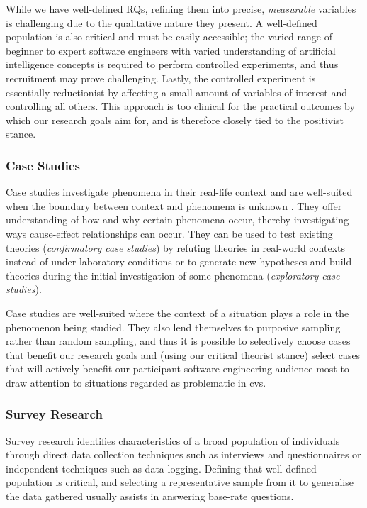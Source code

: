 While we have well-defined RQs, refining them into precise, \textit{measurable} variables is challenging due to the qualitative nature they present. A well-defined population is also critical and must be easily accessible; the varied range of beginner to expert software engineers with varied understanding of artificial intelligence concepts is required to perform controlled experiments, and thus recruitment may prove challenging. Lastly, the controlled experiment is essentially reductionist by affecting a small amount of variables of interest and controlling all others. This approach is too clinical for the practical outcomes by which our research goals aim for, and is therefore closely tied to the positivist stance.

\subsubsection{Case Studies}
Case studies investigate phenomena in their real-life context and are well-suited when the boundary between context and phenomena is unknown \citep{Yin:2017tf}. They offer understanding of how and why certain phenomena occur, thereby investigating ways cause-effect relationships can occur. They can be used to test existing theories (\textit{confirmatory case studies}) by refuting theories in real-world contexts instead of under laboratory conditions or to generate new hypotheses and build theories during the initial investigation of some phenomena (\textit{exploratory case studies}).

Case studies are well-suited where the context of a situation plays a role in the phenomenon being studied. They also lend themselves to purposive sampling rather than random sampling, and thus it is possible to selectively choose cases that benefit our research goals and (using our critical theorist stance) select cases that will actively benefit our participant software engineering audience most to draw attention to situations regarded as problematic in \gls{cvs}.

\subsubsection{Survey Research}
Survey research identifies characteristics of a broad population of individuals through direct data collection techniques such as interviews and questionnaires or independent techniques such as data logging. Defining that well-defined population is critical, and selecting a representative sample from it to generalise the data gathered usually assists in answering base-rate questions.

